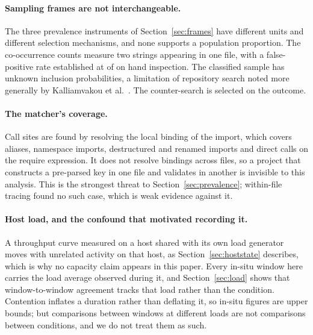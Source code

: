 \documentclass[pdflatex,sn-basic,twocolumn]{sn-jnl}%
\newif\ifabdata \abdatatrue
\begin{document}
\paragraph{Sampling frames are not interchangeable.} The three prevalence
instruments of Section~\ref{sec:frames} have different units and different
selection mechanisms, and none supports a population proportion. The
co-occurrence counts measure two strings appearing in one file, with a
false-positive rate established at \AdjudicatedFalsePositive{} of
\AdjudicatedTotal{} on hand inspection. The classified sample has unknown
inclusion probabilities, a limitation of repository search noted more generally
by Kalliamvakou et al.~\cite{kalliamvakou2014promises}. The counter-search is
selected on the outcome.

\paragraph{The matcher's coverage.} Call sites are found by resolving the local
binding of the import, which covers aliases, namespace imports, destructured and
renamed imports and direct calls on the require expression. It does not resolve
bindings across files, so a project that constructs a pre-parsed key in one file
and validates in another is invisible to this analysis. This is the strongest
threat to Section~\ref{sec:prevalence}; within-file tracing found no such case,
which is weak evidence against it.

\paragraph{Host load, and the confound that motivated recording it.} A
throughput curve measured on a host shared with its own load generator moves with
unrelated activity on that host, as Section~\ref{sec:hoststate} describes, which
is why no capacity claim appears in this paper. Every in-situ window here carries
the load average observed during it, and Section~\ref{sec:load} shows that window-to-window
agreement tracks that load rather than the condition. Contention inflates a
duration rather than deflating it, so in-situ figures are upper bounds; but
comparisons between windows at different loads are not comparisons between
conditions, and we do not treat them as such.

\ifabdata
\end{document}
